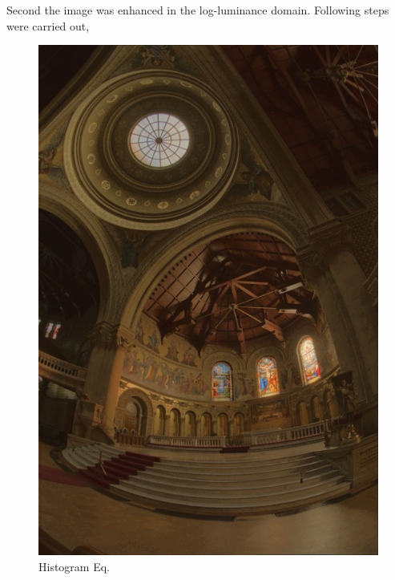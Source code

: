 \documentclass{article}
\begin{document}
    \pagebreak
    Second the image was enhanced in the log-luminance domain. Following steps were carried out, \\
    \begin{figure}[!htb]
      \includegraphics[scale=.27]{./data/2/lg/s1.jpg}
      \caption{Histogram Eq.}
    \endminipage\hfill

\end{figure}
\end{document}
